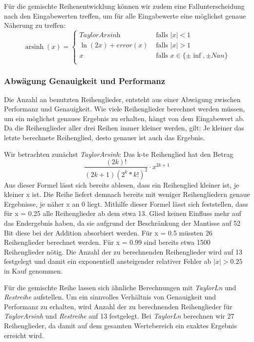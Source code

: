 \documentclass[course=erap] {aspdoc}
\begin{document}
    Für die gemischte Reihenentwicklung können wir zudem eine Fallunterscheidung nach den Eingabewerten treffen, um für alle Eingabewerte eine möglichst genaue Näherung zu treffen:
    \[ \operatorname{arsinh}(x) =
    \begin{cases}
        \textit{TaylorArsinh}     & \text{ falls } |x| < 1 \\
        \ln(2x) + error(x)  & \text{ falls } |x| >1 \\
        x     & \text{ falls } x \in \{\pm\inf, \pm Nan\}\\
    \end{cases}\]

    \subsubsection{Abwägung Genauigkeit und Performanz}
    Die Anzahl an benutzten Reihenglieder, entsteht aus einer Abwägung zwischen Performanz und Genauigkeit.
    Wie viele Reihenglieder berechnet werden müssen, um ein möglichst genaues Ergebnis zu erhalten, hängt von dem Eingabewert ab.
    Da die Reihenglieder aller drei Reihen immer kleiner werden, gilt: Je kleiner das letzte berechnete Reihenglied, desto genauer ist auch das Ergebnis.

    Wir betrachten zunächst \textit{TaylorArsinh}:
    Das k-te Reihenglied hat den Betrag
    \[
        \frac{(2k)!}{(2k + 1)(2^k*k!)^2}\cdot x^{2k+1}
    \]
    Aus dieser Formel lässt sich bereits ablesen, dass ein Reihenglied kleiner ist, je kleiner x ist.
    Die Reihe liefert demnach bereits mit weniger Reihengliedern genaue Ergebnisse, je näher x an 0 liegt.
    Mithilfe dieser Formel lässt sich feststellen, dass für x = 0.25 alle Reihenglieder ab dem etwa 13. Glied keinen Einfluss mehr auf das Endergebnis haben, da sie aufgrund der Beschränkung der Mantisse auf 52 Bit diese bei der Addition absorbiert werden.
    Für x = 0.5 müssten 26 Reihenglieder berechnet werden.
    Für x = 0.99 sind bereits etwa 1500 Reihenglieder nötig.
    Die Anzahl der zu berechnenden Reihenglieder wird auf 13 festgelegt und damit ein exponentiell ansteigender relativer Fehler ab $|x|>0.25$ in Kauf genommen.
    
    Für die gemischte Reihe lassen sich ähnliche Berechnungen mit \textit{TaylorLn} und \textit{Restreihe} aufstellen. Um ein sinnvolles Verhältnis von Genauigkeit und Performanz zu erhalten, wird Anzahl der zu berechnenden Reihenglieder für \textit{TaylorArsinh} und \textit{Restreihe} auf 13 festgelegt. Bei \textit{TaylorLn} berechnen wir 27 Reihenglieder, da damit auf dem gesamten Wertebereich ein exaktes Ergebnis erreicht wird.
\end{document}
